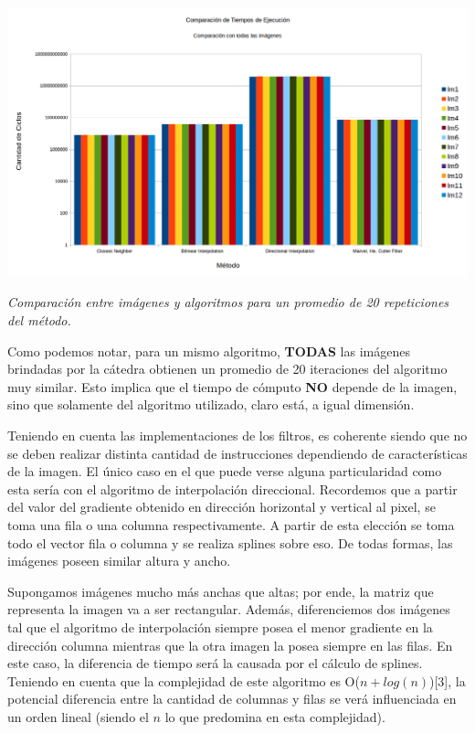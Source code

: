 \begin{itemize}
	\begin{center}
		\includegraphics[scale=0.4]{./img/comparacionMetodoImagen.png}
		\vspace{2pt}
		\par
		\footnotesize\textit{Comparación entre imágenes y algoritmos para un promedio de 20 repeticiones del método.}
	\end{center}

Como podemos notar, para un mismo algoritmo, \textbf{TODAS} las imágenes brindadas por la cátedra obtienen un promedio de 20 iteraciones del algoritmo muy similar. Esto implica que el tiempo de cómputo \textbf{NO} depende de la imagen, sino que solamente del algoritmo utilizado, claro está, a igual dimensión. 

Teniendo en cuenta las implementaciones de los filtros, es coherente siendo que no se deben realizar distinta cantidad de instrucciones dependiendo de características de la imagen. El único caso en el que puede verse alguna particularidad como esta sería con el algoritmo de interpolación direccional. Recordemos que a partir del valor del gradiente obtenido en dirección horizontal y vertical al pixel, se toma una fila o una columna respectivamente. A partir de esta elección se toma todo el vector fila o columna y se realiza splines sobre eso. De todas formas, las imágenes poseen similar altura y ancho.

Supongamos imágenes mucho más anchas que altas; por ende, la matriz que representa la imagen va a ser rectangular. Además, diferenciemos dos imágenes tal que el algoritmo de interpolación siempre posea el menor gradiente en la dirección columna mientras que la otra imagen la posea siempre en las filas. En este caso, la diferencia de tiempo será la causada por el cálculo de splines. Teniendo en cuenta que la complejidad de este algoritmo es O($n + log(n)$)[3], la potencial diferencia entre la cantidad de columnas y filas se verá influenciada en un orden lineal (siendo el $n$ lo que predomina en esta complejidad).


\end{itemize}
